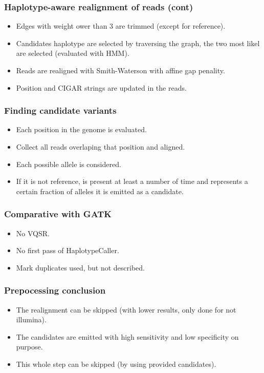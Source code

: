 \documentclass{beamer}
\begin{document}
\begin{frame}
    \frametitle{Haplotype-aware realignment of reads (cont)}

    \begin{itemize}
        \item Edges with weight ower than 3 are trimmed (except for reference).
        \item Candidates haplotype are selected by traversing the graph, the two most likel are
              selected (evaluated with HMM).
        \item Reads are realigned with Smith-Waterson with affine gap penality.
        \item Position and CIGAR strings are updated in the reads.
    \end{itemize}
\end{frame}

\begin{frame}
    \frametitle{Finding candidate variants}

    \begin{itemize}
        \item Each position in the genome is evaluated.
        \item Collect all reads overlaping that position and aligned.
        \item Each possible allele is considered.
        \item If it is not reference, is present at least a number of time and represents a certain
            fraction of alleles it is emitted as a candidate.
    \end{itemize}

\end{frame}

\begin{frame}
    \frametitle{Comparative with GATK}

    \begin{itemize}
        \item No VQSR.
        \item No first pass of HaplotypeCaller.
        \item Mark duplicates used, but not described.
    \end{itemize}

\end{frame}

\begin{frame}
    \frametitle{Prepocessing conclusion}

    \begin{itemize}
        \item The realignment can be skipped (with lower results, only done for not illumina).
        \item The candidates are emitted with high sensitivity and low specificity on purpose.
        \item This whole step can be skipped (by using provided candidates).
    \end{itemize}

\end{frame}
\end{document}
